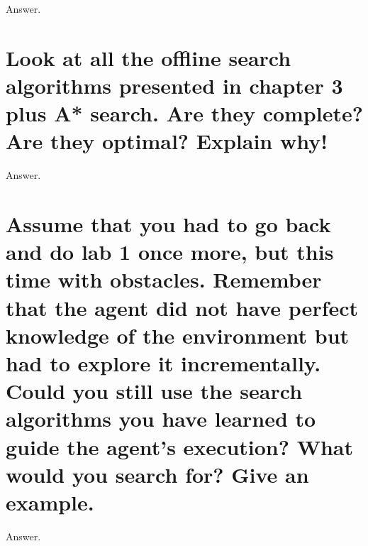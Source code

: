 \documentclass{article}
\begin{document}
Answer.

\section{Look at all the offline search algorithms presented in chapter 3 plus A* search. Are they complete? Are they optimal? Explain why!}

Answer.

\section{Assume that you had to go back and do lab 1 once more, but this time with obstacles. Remember that the agent did not have perfect knowledge of the environment but had to explore it incrementally. Could you still use the search algorithms you have learned to guide the agent's execution? What would you search for? Give an example.}

Answer.
\end{document}

